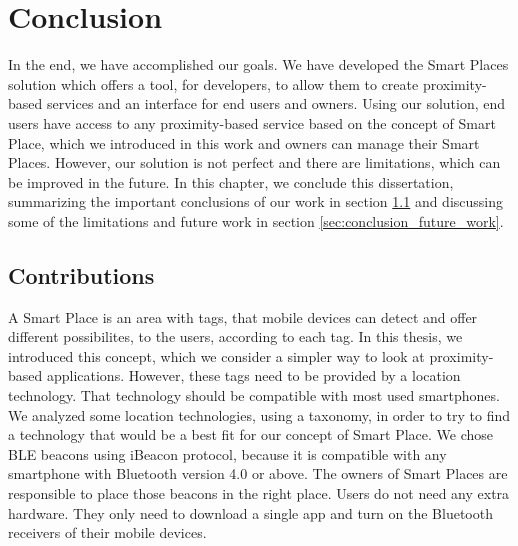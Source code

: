 
\section{Conclusion}
\label{sec:conclusion}
In the end, we have accomplished our goals.
We have developed the Smart Places solution which offers a tool, for developers, to allow them to create proximity-based services and an interface for end users and owners.
Using our solution, end users have access to any proximity-based service based on the concept of Smart Place, which we introduced in this work and owners can manage their Smart Places.
However, our solution is not perfect and there are limitations, which can be improved in the future.
In this chapter, we conclude this dissertation, summarizing the important conclusions of our work in section \ref{sec:conclusion_contributions} and discussing some of the limitations and future work in section \ref{sec:conclusion_future_work}.

\subsection{Contributions}
\label{sec:conclusion_contributions}
A Smart Place is an area with tags, that mobile devices can detect and offer different possibilites, to the users, according to each tag.
In this thesis, we introduced this concept, which we consider a simpler way to look at proximity-based applications.
However, these tags need to be provided by a location technology.
That technology should be compatible with most used smartphones.
We analyzed some location technologies, using a taxonomy\cite{location}, in order to try to find a technology that would be a best fit for our concept of Smart Place.
We chose \gls{BLE} beacons using iBeacon protocol, because it is compatible with any smartphone with Bluetooth version 4.0 or above.
The owners of Smart Places are responsible to place those beacons in the right place.
Users do not need any extra hardware.
They only need to download a single app and turn on the Bluetooth receivers of their mobile devices.

